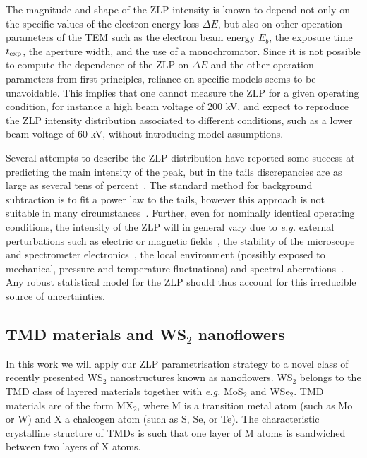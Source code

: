 The magnitude and shape of the ZLP intensity is known to depend not only on the specific values
of the electron energy loss $\Delta E$, but also on other operation parameters
of the TEM such as the electron beam energy $E_{b}$, the exposure time
$t_{\rm exp}$, the aperture width, and the use of a monochromator.
%
Since it is not possible to compute the dependence of the ZLP on $\Delta E$
and the other operation parameters from first principles,
reliance on specific models seems to be unavoidable.
%
This implies that one cannot measure the ZLP for a given operating
condition, for instance a high beam voltage of 200 kV, and expect to reproduce
the ZLP intensity distribution
associated to different conditions, such as a lower beam voltage of 60 kV,
without introducing model assumptions.

Several attempts to describe the ZLP distribution have reported
some success at predicting the main intensity of the peak, 
but in the tails discrepancies are as large as several tens of percent~\cite{Bangert:2003}.
%
The standard method for background subtraction
is to fit a power law to the tails, however this approach is not suitable in
many circumstances~\cite{Hachtel:2018, Tenailleau:1992, Reed:2002, Bosman:2006}.
%
Further, even for nominally identical operating conditions, the intensity of the ZLP
will in general vary due to {\it e.g.} external perturbations such as electric or magnetic fields~\cite{Rafferty:2000},
the stability of the microscope and spectrometer electronics~\cite{Kothleitner:2003}, the local
environment (possibly exposed to mechanical, pressure and temperature fluctuations) 
and spectral aberrations~\cite{Egerton:1996}. 
%
Any robust statistical model for the ZLP should thus account for this irreducible source of uncertainties.

\subsection{TMD materials and WS$_2$ nanoflowers}
\label{sec:tmd}

In this work we will apply our ZLP parametrisation strategy
 to a novel class of recently presented WS$_2$ nanostructures known
as nanoflowers.
%
WS$_2$ belongs to the TMD class of layered materials together with {\it e.g.}
MoS$_2$ and WSe$_2$.
%
TMD materials are of the form MX$_2$, where M is a 
transition metal atom (such as Mo or W) and X a chalcogen atom (such as S, Se, or Te). 
%
The characteristic crystalline structure of TMDs is such that
one layer of M atoms is sandwiched between two layers of X atoms.

